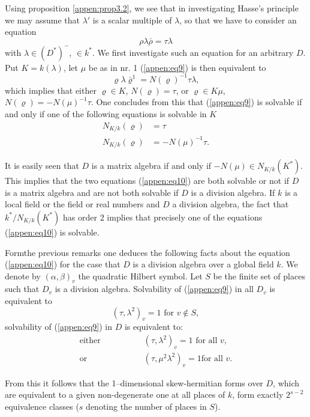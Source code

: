 Using proposition \ref{appen:prop3.2}, we see that in investigating Hasse's
principle we may assume that $\lambda'$ is a scalar multiple of
$\lambda$, so that we have to consider an equation 
\begin{equation*}
\rho \lambda \bar{\rho} = \tau \lambda \tag{9}\label{appen:eq9}
\end{equation*}
with $\lambda \in (D^*)^-$, $\in k^*$. We first investigate such an
equation for an arbitrary $D$. Put $K = k (\lambda)$, let $\mu$ be as
in nr. 1 (\ref{appen:eq9}) is then equivalent to 
$$
\varrho \lambda \bar{\varrho}^1  = N (\varrho)^{-1} \tau \lambda,
$$
which implies that either $\varrho \in K$, $N (\varrho) = \tau$, or
$\varrho \in K \mu$, $N(\varrho) = - N (\mu)^{-1} \tau$. One
concludes from this that (\ref{appen:eq9}) is solvable if and only if one of the
following equations is solvable in $K$ 
\begin{align*}
 N_{K/k} (\varrho) & = \tau \\ 
 N_{K/k} (\varrho) & = -N (\mu)^{-1} \tau .\tag{10}\label{appen:eq10}
\end{align*}

It is easily seen that $D$ is a matrix algebra if and only if $-N(\mu)
\in N_{K/k}(K^*)$. This implies that the two equations
(\ref{appen:eq10}) are both 
solvable or not if $D$ is a matrix algebra and are not both solvable
if $D$ is a division algebra. If $k$ is a local field or the field or
real numbers and $D$ a division algebra, the fact that $k^* /
N_{K/k}(K^*)$ has order 2 implies that precisely one of the
equations (\ref{appen:eq10}) is solvable. 

Form\pageoriginale the previous remarks one deduces the following
facts about the equation (\ref{appen:eq10}) for the case that $D$ is a division
algebra over a global field $k$. We denote by $(\alpha, \beta)_v$ the
quadratic Hilbert symbol. Let $S$ be the finite set of places such
that $D_v$ is a division algebra. Solvability of (\ref{appen:eq9}) in all $D_v$ is
equivalent to   
$$
(\tau, \lambda^2)_v = 1 \text{ for } v \notin S,
$$
solvability of (\ref{appen:eq9}) in $D$ is equivalent to:
\begin{align*}
\text{either } \qquad & \qquad (\tau, \lambda^2)_v  = 1 \text { for  all } v,\\
\text{or } \qquad & \qquad  (\tau , \mu^2 \lambda^2)_v  = 1 \text {
  for all } v.  
\end{align*}

From this it follows that the 1--dimensional skew-hermitian
forms over $D$, which are equivalent to a given non-degenerate one
at all places of $k$, form exactly $2^{s-2}$ equivalence classes ($s$
denoting the number of places in $S$). 

